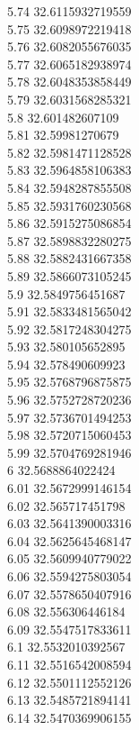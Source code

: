 {5.74	32.6115932719559\\
5.75	32.6098972219418\\
5.76	32.6082055676035\\
5.77	32.6065182938974\\
5.78	32.6048353858449\\
5.79	32.6031568285321\\
5.8	32.601482607109\\
5.81	32.59981270679\\
5.82	32.5981471128528\\
5.83	32.5964858106383\\
5.84	32.5948287855508\\
5.85	32.5931760230568\\
5.86	32.5915275086854\\
5.87	32.5898832280275\\
5.88	32.5882431667358\\
5.89	32.5866073105245\\
5.9	32.5849756451687\\
5.91	32.5833481565042\\
5.92	32.5817248304275\\
5.93	32.580105652895\\
5.94	32.578490609923\\
5.95	32.5768796875875\\
5.96	32.5752728720236\\
5.97	32.5736701494253\\
5.98	32.5720715060453\\
5.99	32.5704769281946\\
6	32.5688864022424\\
6.01	32.5672999146154\\
6.02	32.565717451798\\
6.03	32.5641390003316\\
6.04	32.5625645468147\\
6.05	32.5609940779022\\
6.06	32.5594275803054\\
6.07	32.5578650407916\\
6.08	32.556306446184\\
6.09	32.5547517833611\\
6.1	32.5532010392567\\
6.11	32.5516542008594\\
6.12	32.5501112552126\\
6.13	32.5485721894141\\
6.14	32.5470369906155\\
}
